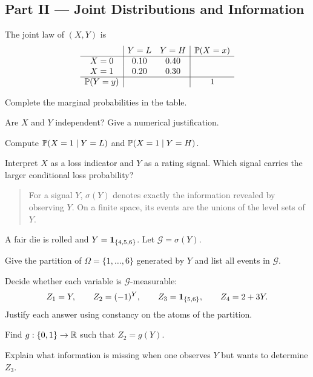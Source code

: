 \subsection*{Part II --- Joint Distributions and Information}

\begin{exercise}
The joint law of $(X,Y)$ is
\[
\begin{array}{c|cc|c}
 & Y=L & Y=H & \mathbb{P}(X=x)\\ \hline
X=0 & 0.10 & 0.40 & {}\\
X=1 & 0.20 & 0.30 & {}\\ \hline
\mathbb{P}(Y=y) & {} & {} & 1
\end{array}
\]
\begin{exparts}
  \item Complete the marginal probabilities in the table.
  \item Are $X$ and $Y$ independent? Give a numerical justification.
  \item Compute $\mathbb{P}(X=1\mid Y=L)$ and $\mathbb{P}(X=1\mid Y=H)$.
  \item Interpret $X$ as a loss indicator and $Y$ as a rating signal. Which
  signal carries the larger conditional loss probability?
\end{exparts}
\end{exercise}

\begin{quote}\small
For a signal $Y$, $\sigma(Y)$ denotes exactly the information revealed by
observing $Y$. On a finite space, its events are the unions of the level sets
of $Y$.
\end{quote}

\begin{exercise}
A fair die is rolled and $Y=\mathbf{1}_{\{4,5,6\}}$. Let $\mathcal G=\sigma(Y)$.
\begin{exparts}
  \item Give the partition of $\Omega=\{1,\ldots,6\}$ generated by $Y$ and
  list all events in $\mathcal G$.
  \item Decide whether each variable is $\mathcal G$-measurable:
  \[
  Z_1=Y,\qquad Z_2=(-1)^Y,\qquad
  Z_3=\mathbf{1}_{\{5,6\}},\qquad Z_4=2+3Y.
  \]
  Justify each answer using constancy on the atoms of the partition.
  \item Find $g:\{0,1\}\to\mathbb{R}$ such that $Z_2=g(Y)$.
  \item Explain what information is missing when one observes $Y$ but wants
  to determine $Z_3$.
\end{exparts}
\end{exercise}

